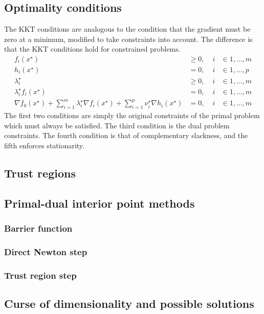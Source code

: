 \subsection{Optimality conditions}
The KKT conditions are analogous to the condition that the gradient must be zero at a minimum, modified to take constraints into account. The difference is that the KKT conditions hold for constrained problems.
\begin{align} \label{eq:kkt}
f_i(x^\star) & \geq 0, \; & i & \in {1,\dots,m} \nonumber \\
h_i(x^\star) & = 0, \; & i & \in {1,\dots,p} \nonumber \\
\lambda_i^\star & \geq 0, \; & i & \in {1,\dots,m} \\
\lambda_i^\star f_i(x^\star) & = 0, \; & i & \in {1,\dots,m} \nonumber \\
\nabla f_0(x^\star) + \sum_{i=1}^m \lambda_i^\star \nabla f_i(x^\star)
+ \sum_{i=1}^p \nu_i^\star \nabla h_i(x^\star) & = 0, \; & i & \in {1,\dots,m} \nonumber
\end{align}
The first two conditions are simply the original constraints of the primal problem which must always be satisfied. The third condition is the dual problem constraints. The fourth condition is that of complementary slackness, and the fifth enforces stationarity.

\subsection{Trust regions}

\subsection{Primal-dual interior point methods}
\subsubsection{Barrier function}
\subsubsection{Direct Newton step}
\subsubsection{Trust region step}

\subsection{Curse of dimensionality and possible solutions}

